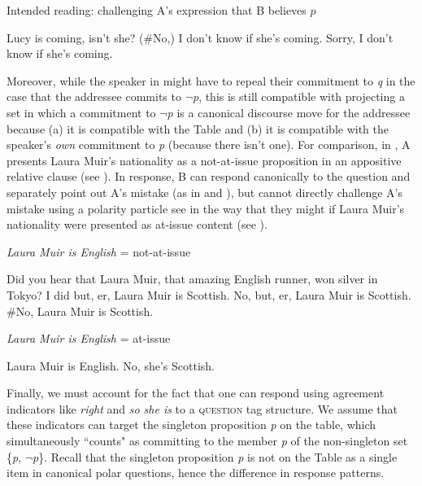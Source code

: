 \documentclass[output=paper,colorlinks,citecolor=brown]{langscibook}
\begin{document}
\begin{exe}
\ex Intended reading: challenging A's expression that B believes $p$
\begin{xlist}
 Lucy is coming, isn't she?
  (\#No,) I don't know if she's coming. 	   	     
  Sorry, I don't know if she's coming.
\end{xlist}
\end{exe}
 
Moreover, while the speaker in  might have to repeal their commitment to \textit{q} in the case that the addressee commits to $\neg$\textit{p}, this is still compatible with projecting a set in which a commitment to $\neg$\textit{p} is a canonical discourse move for the addressee because (a) it is compatible with the Table and (b) it is compatible with the speaker's \textit{own} commitment to \textit{p} (because there isn't one). For comparison, in , A presents Laura Muir's nationality as a not-at-issue proposition in an appositive relative clause (see \citealt{potts2005}). In response, B can respond canonically to the question and separately point out A's mistake (as in  and ), but cannot directly challenge A's mistake using a polarity particle see  in the way that they might if Laura Muir's nationality were presented as at-issue content (see ).

\begin{exe}
    \ex \textit{Laura Muir is English} = not-at-issue\label{muirenglishnai}
    \begin{xlist}
   Did you hear that Laura Muir, that amazing English runner, won silver in Tokyo?
   I did but, er, Laura Muir is Scottish.\label{canon1}
   No, but, er, Laura Muir is Scottish.\label{canon2}
   \#No, Laura Muir is Scottish.\label{noncanon}
    \end{xlist}
\end{exe}

\begin{exe}
\ex \textit{Laura Muir is English} = at-issue \label{muirenglishai}
    \begin{xlist}
 Laura Muir is English.
 No, she's Scottish.
    \end{xlist}
\end{exe}

Finally, we must account for the fact that one can respond using agreement indicators like \textit{right} and \textit{so she is} to a \textsc{question} tag structure. We assume that these indicators can target the singleton proposition \textit{p} on the table, which simultaneously ``counts" as committing to the member \textit{p} of the non-singleton set \{\textit{p}, $\neg$\textit{p}\}. Recall that the singleton proposition \textit{p} is not on the Table as a single item in canonical polar questions, hence the difference in response patterns.
\end{document}
